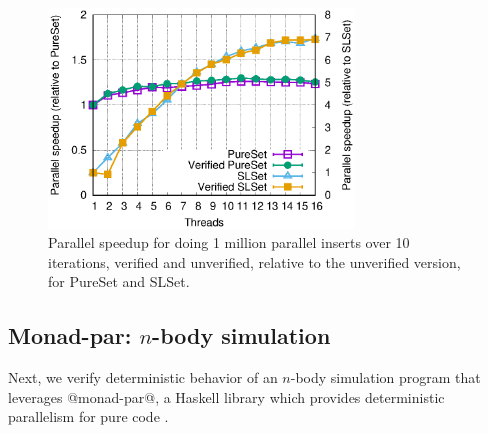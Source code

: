\begin{figure}
\captionsetup{justification=centering}
  \begin{center}
    \includegraphics[width=3.2in]{text/refinementreflection/set.eps}
  \end{center}
  \caption[Parallel speedup for PureSet and SLSet.]
    {Parallel speedup for doing 1 million parallel inserts over 10
    iterations, verified and unverified, relative to the unverified version,
    for PureSet and SLSet.}
  \label{fig:set}
\end{figure}

\subsection{Monad-par: $n$-body simulation}
\label{sec:nbody}
Next, we verify deterministic behavior of an
$n$-body simulation program that leverages @monad-par@, a Haskell library which
provides deterministic parallelism for pure code \cite{monad-par}.

